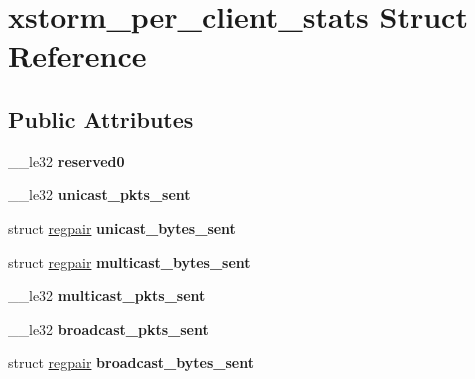 \hypertarget{structxstorm__per__client__stats}{
\section{xstorm\_\-per\_\-client\_\-stats Struct Reference}
\label{structxstorm__per__client__stats}
}
\subsection*{Public Attributes}
\begin{DoxyCompactItemize}
\item 
\hypertarget{structxstorm__per__client__stats_a13747601aa7a250670745c264d45ab45}{
\_\-\_\-le32 {\bfseries reserved0}}
\label{structxstorm__per__client__stats_a13747601aa7a250670745c264d45ab45}

\item 
\hypertarget{structxstorm__per__client__stats_adffa01398a2d29b5cb610fa58ffb5e9b}{
\_\-\_\-le32 {\bfseries unicast\_\-pkts\_\-sent}}
\label{structxstorm__per__client__stats_adffa01398a2d29b5cb610fa58ffb5e9b}

\item 
\hypertarget{structxstorm__per__client__stats_aaeb78c259ec8db41bb2ad1b10b093b11}{
struct \hyperlink{structregpair}{regpair} {\bfseries unicast\_\-bytes\_\-sent}}
\label{structxstorm__per__client__stats_aaeb78c259ec8db41bb2ad1b10b093b11}

\item 
\hypertarget{structxstorm__per__client__stats_a3c4848cf143b0ec387c7a4f39c5cded8}{
struct \hyperlink{structregpair}{regpair} {\bfseries multicast\_\-bytes\_\-sent}}
\label{structxstorm__per__client__stats_a3c4848cf143b0ec387c7a4f39c5cded8}

\item 
\hypertarget{structxstorm__per__client__stats_a9f1f5ab58dc2b9525887eebc3182b007}{
\_\-\_\-le32 {\bfseries multicast\_\-pkts\_\-sent}}
\label{structxstorm__per__client__stats_a9f1f5ab58dc2b9525887eebc3182b007}

\item 
\hypertarget{structxstorm__per__client__stats_a235b789fed52f1425b2f35671b4c31f4}{
\_\-\_\-le32 {\bfseries broadcast\_\-pkts\_\-sent}}
\label{structxstorm__per__client__stats_a235b789fed52f1425b2f35671b4c31f4}

\item 
\hypertarget{structxstorm__per__client__stats_aafdf3c157adcd8877682bcbd7f7c1371}{
struct \hyperlink{structregpair}{regpair} {\bfseries broadcast\_\-bytes\_\-sent}}
\label{structxstorm__per__client__stats_aafdf3c157adcd8877682bcbd7f7c1371}


\end{DoxyCompactItemize}
